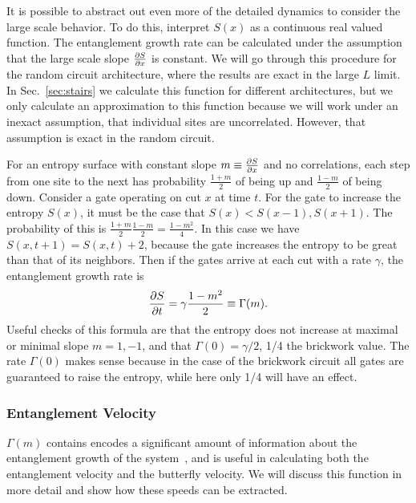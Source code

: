 It is possible to abstract out even more of the detailed dynamics to consider the large scale behavior. To do this, interpret $S(x)$ as a continuous real valued function. The entanglement growth rate can be calculated under the assumption that the large scale slope $\frac{\partial S}{\partial x}$ is constant. We will go through this procedure for the random circuit architecture, where the results are exact in the large $L$ limit. In Sec.~\ref{sec:stairs} we calculate this function for different architectures, but we only calculate an approximation to this function because we will work under an inexact assumption, that individual sites are uncorrelated. However, that assumption is exact in the random circuit.

For an entropy surface with constant slope $m\equiv\frac{\partial S}{\partial x}$ and no correlations, each step from one site to the next has probability $\frac{1+m}{2}$ of being up and $\frac{1-m}{2}$ of being down. Consider a gate operating on cut $x$ at time $t$. For the gate to increase the entropy $S(x)$, it must be the case that $S(x)<S(x-1), S(x+1)$. The probability of this is $\frac{1+m}{2} \frac{1-m}{2} = \frac{1-m^2}{4}$. In this case we have $S(x,t+1)=S(x,t)+2$, because the gate increases the entropy to be great than that of its neighbors. Then if the gates arrive at each cut with a rate $\gamma$, the entanglement growth rate is
\begin{align}
\frac{\partial S}{\partial t} = \gamma\frac{1-m^2}{2}\equiv \Gamma(m). \label{eqn:randomgrowthrate}
\end{align}
Useful checks of this formula are that the entropy does not increase at maximal or minimal slope $m=1,-1$, and that $\Gamma(0)=\gamma/2$, 1/4 the brickwork value. The rate $\Gamma(0)$ makes sense because in the case of the brickwork circuit all gates are guaranteed to raise the entropy, while here only 1/4 will have an effect.

\subsubsection{Entanglement Velocity} \label{subsub:v_E }

$\Gamma(m)$ contains encodes a significant amount of information about the entanglement growth of the system~\cite{Jonay18}, and is useful in calculating both the entanglement velocity and the butterfly velocity. We will discuss this function in more detail and show how these speeds can be extracted.

